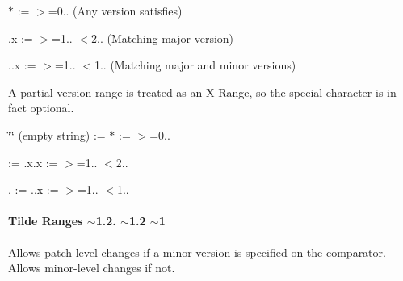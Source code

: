 \begin{DoxyItemize}
\item {\ttfamily $\ast$} \+:= {\ttfamily $>$=0..} (Any version satisfies)
\item {.\+x} \+:= {\ttfamily $>$=1.. $<$2..} (Matching major version)
\item {..\+x} \+:= {\ttfamily $>$=1.. $<$1..} (Matching major and minor versions)
\end{DoxyItemize}

A partial version range is treated as an X-\/\+Range, so the special character is in fact optional.


\begin{DoxyItemize}
\item {\ttfamily \char`\"{}\char`\"{}} (empty string) \+:= {\ttfamily $\ast$} \+:= {\ttfamily $>$=0..}
\item {} \+:= {.\+x.\+x} \+:= {\ttfamily $>$=1.. $<$2..}
\item {.} \+:= {..\+x} \+:= {\ttfamily $>$=1.. $<$1..}
\end{DoxyItemize}

\paragraph*{Tilde Ranges {\ttfamily $\sim$1.2.} {\ttfamily $\sim$1.2} {\ttfamily $\sim$1}}

Allows patch-\/level changes if a minor version is specified on the comparator. Allows minor-\/level changes if not.


